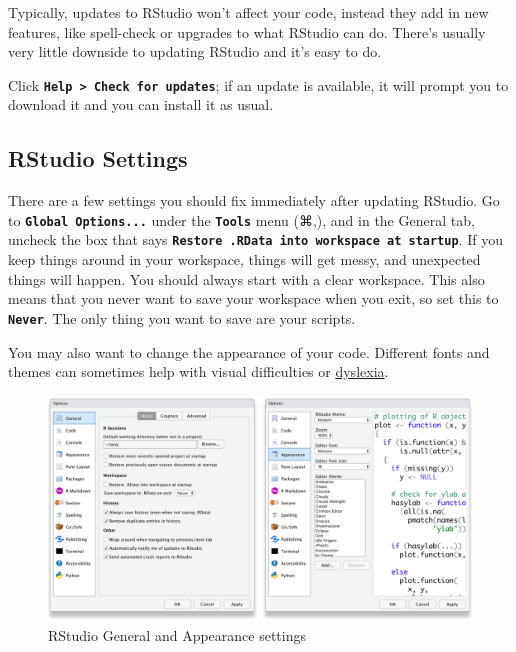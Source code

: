 \documentclass[
  oneside]{book}
\begin{document}
Typically, updates to RStudio won't affect your code, instead they add in new features, like spell-check or upgrades to what RStudio can do. There's usually very little downside to updating RStudio and it's easy to do.

Click \textbf{\texttt{Help\ \textgreater{}\ Check\ for\ updates}}; if an update is available, it will prompt you to download it and you can install it as usual.

\hypertarget{rstudio-settings}{%
\subsection{RStudio Settings}\label{rstudio-settings}}

There are a few settings you should fix immediately after updating RStudio. Go to \textbf{\texttt{Global\ Options...}} under the \textbf{\texttt{Tools}} menu (⌘,), and in the General tab, uncheck the box that says \textbf{\texttt{Restore\ .RData\ into\ workspace\ at\ startup}}. If you keep things around in your workspace, things will get messy, and unexpected things will happen. You should always start with a clear workspace. This also means that you never want to save your workspace when you exit, so set this to \textbf{\texttt{Never}}. The only thing you want to save are your scripts.

You may also want to change the appearance of your code. Different fonts and themes can sometimes help with visual difficulties or \href{https://datacarpentry.org/blog/2017/09/coding-and-dyslexia}{dyslexia}.

\begin{figure}

{\centering \includegraphics[width=1\linewidth]{images/appendices/rstudio_settings_general_appearance} 

}

\caption{RStudio General and Appearance settings}\label{fig:settings-general}
\end{figure}
\end{document}
